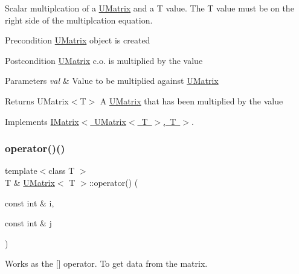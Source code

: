 Scalar multiplcation of a \mbox{\hyperlink{class_u_matrix}{U\+Matrix}} and a T value. The T value must be on the right side of the multiplcation equation. 

\begin{DoxyPrecond}{Precondition}
\mbox{\hyperlink{class_u_matrix}{U\+Matrix}} object is created 
\end{DoxyPrecond}
\begin{DoxyPostcond}{Postcondition}
\mbox{\hyperlink{class_u_matrix}{U\+Matrix}} c.\+o. is multiplied by the value 
\end{DoxyPostcond}

\begin{DoxyParams}{Parameters}
{\em val} & Value to be multiplied against \mbox{\hyperlink{class_u_matrix}{U\+Matrix}} \\
\hline
\end{DoxyParams}
\begin{DoxyReturn}{Returns}
U\+Matrix$<$\+T$>$ A \mbox{\hyperlink{class_u_matrix}{U\+Matrix}} that has been multiplied by the value 
\end{DoxyReturn}


Implements \mbox{\hyperlink{class_i_matrix_a10121e038635bdf33552c6a1fb288398}{I\+Matrix$<$ U\+Matrix$<$ T $>$, T $>$}}.

\mbox{\label{class_u_matrix_a06c554ab9d6deb7d1950cdd49eb089e0}} 
\subsubsection{\texorpdfstring{operator()()}{operator()()}\hspace{0.1cm}{\footnotesize\ttfamily [1/2]}}
{\footnotesize\ttfamily template$<$class T $>$ \\
T \& \mbox{\hyperlink{class_u_matrix}{U\+Matrix}}$<$ T $>$\+::operator() (\begin{DoxyParamCaption}\item[{const int \&}]{i,  }\item[{const int \&}]{j }\end{DoxyParamCaption})\hspace{0.3cm}{\ttfamily [virtual]}}



Works as the \mbox{[}\mbox{]} operator. To get data from the matrix. 

